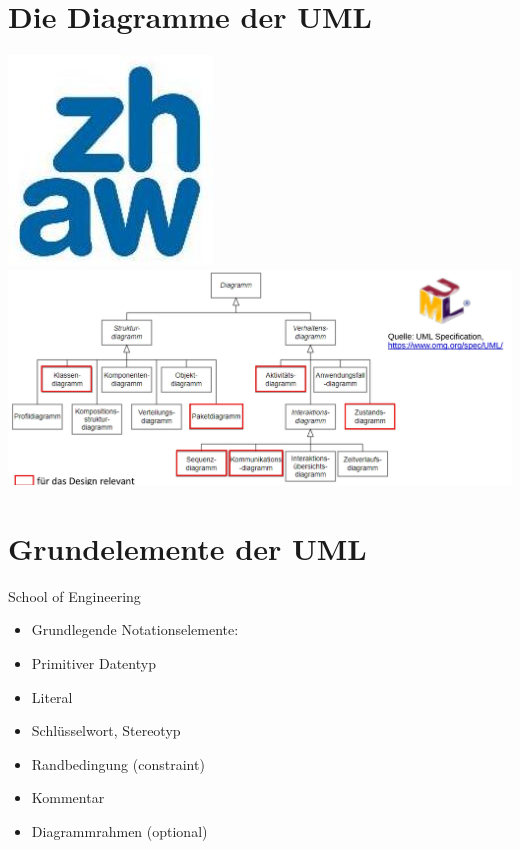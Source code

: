 \documentclass[10pt]{article}
\begin{document}
\section*{Die Diagramme der UML}
\includegraphics[max width=\textwidth, center]{2025_01_02_787afb9584031d2940deg-11}\\
\includegraphics[max width=\textwidth, center]{2025_01_02_787afb9584031d2940deg-11(1)}

\section*{Grundelemente der UML}
School of Engineering

\begin{itemize}
  \item Grundlegende Notationselemente:
  \item Primitiver Datentyp
  \item Literal
  \item Schlüsselwort, Stereotyp
  \item Randbedingung (constraint)
  \item Kommentar
  \item Diagrammrahmen (optional)
\end{itemize}
\end{document}
